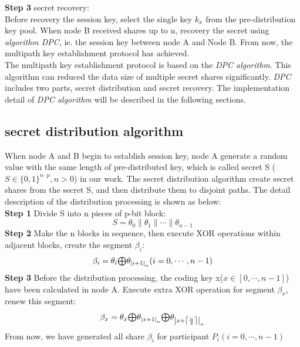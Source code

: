 \documentclass[nocopyrightspace,9pt]{sigplanconf}
\newcommand\lan[2]{{\left|{#1}\right|}_{#2}}
\newcommand\lanceil[2]{\left\lceil\frac{#1}{#2}\right\rceil}
\newcommand\bop[0]{\mathsmaller{\bigoplus}}
\begin{document}
\noindent\textbf{Step 3} secret recovery:\\
Before recovery the session key, select the single key $k_x$ from the pre-distribution key pool.
When node B received shares up to n, recovery the secret using \textit{algorithm DPC},
ie. the session key between node A and Node B. From now, the multipath key establishment
protocol has achieved.\\

The multipath key establishment protocol is based on the \textit{DPC algorithm}.
This algorithm can reduced the data size of multiple secret shares significantly.
\textit{DPC} includes two parts, secret distribution and secret recovery.
The implementation detail of \textit{DPC algorithm} will be described in the following sections.
\subsection{secret distribution algorithm}
When node A and B begin to establish session key, node A generate a random value
with the same length of pre-distributed key,
which is called secret S ($S\in\{0,1\}^{n\cdot p},n>0$) in our work.
The secret distribution algorithm create secret shares from the secret S,
and then distribute them to disjoint paths.
The detail description of the distribution processing is shown as below:\\

\noindent\textbf{Step 1} Divide S into n pieces of p-bit block:\\
\begin{equation}\label{dis_1}
  S=\theta_0\parallel\theta_1\parallel\cdots\parallel\theta_{n-1}
\end{equation}
\textbf{Step 2} Make the n blocks in sequence, then execute XOR
operations within adjacent blocks, create the segment $\beta_i$:\\
\begin{equation}\label{dis_2}
  \beta_i=\theta_i \bop\theta_{\lan{i+1}{n}}(i=0,\cdots,n-1)
\end{equation}
\textbf{Step 3} Before the distribution processing, the coding key x($x\in[0,\cdots ,n-1]$)
have been calculated in node A.
Execute extra XOR operation for segment $\beta_x$, renew this segment:\\
\begin{equation}\label{dis_3}
  \beta_x=\theta_x \bop\theta_{\lan{x+1}{n}}\bop \theta_{\lan{x+\lanceil{n}{2}}{n}}
\end{equation}
From now, we have generated all share $\beta_i$ for participant $P_i(i=0,\cdots,n-1)$
\end{document}
